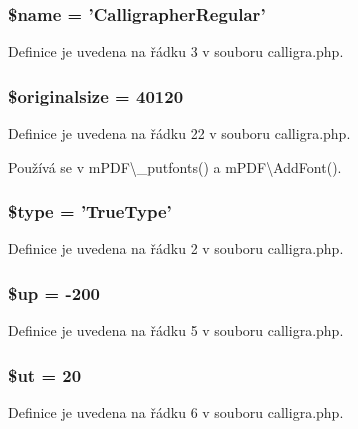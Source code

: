 \hypertarget{calligra_8php_ab2fc40d43824ea3e1ce5d86dee0d763b}{
\subsubsection[{\$name}]{\setlength{\rightskip}{0pt plus 5cm}\$name = 'Calligrapher\-Regular'}}\label{calligra_8php_ab2fc40d43824ea3e1ce5d86dee0d763b}


Definice je uvedena na řádku 3 v souboru calligra.\-php.

\hypertarget{calligra_8php_a25e8bdbc8267d6e88bc21fde74a2c0e8}{
\subsubsection[{\$originalsize}]{\setlength{\rightskip}{0pt plus 5cm}\$originalsize = 40120}}\label{calligra_8php_a25e8bdbc8267d6e88bc21fde74a2c0e8}


Definice je uvedena na řádku 22 v souboru calligra.\-php.



Používá se v m\-P\-D\-F\textbackslash{}\-\_\-putfonts() a m\-P\-D\-F\textbackslash{}\-Add\-Font().

\hypertarget{calligra_8php_a9a4a6fba2208984cabb3afacadf33919}{
\subsubsection[{\$type}]{\setlength{\rightskip}{0pt plus 5cm}\$type = 'True\-Type'}}\label{calligra_8php_a9a4a6fba2208984cabb3afacadf33919}


Definice je uvedena na řádku 2 v souboru calligra.\-php.

\hypertarget{calligra_8php_a6b5ad2ac55f9df46e8f34e78fbd6f176}{
\subsubsection[{\$up}]{\setlength{\rightskip}{0pt plus 5cm}\$up = -\/200}}\label{calligra_8php_a6b5ad2ac55f9df46e8f34e78fbd6f176}


Definice je uvedena na řádku 5 v souboru calligra.\-php.

\hypertarget{calligra_8php_aadd3f841051043ee58e587e840e8dd0b}{
\subsubsection[{\$ut}]{\setlength{\rightskip}{0pt plus 5cm}\$ut = 20}}\label{calligra_8php_aadd3f841051043ee58e587e840e8dd0b}


Definice je uvedena na řádku 6 v souboru calligra.\-php.

